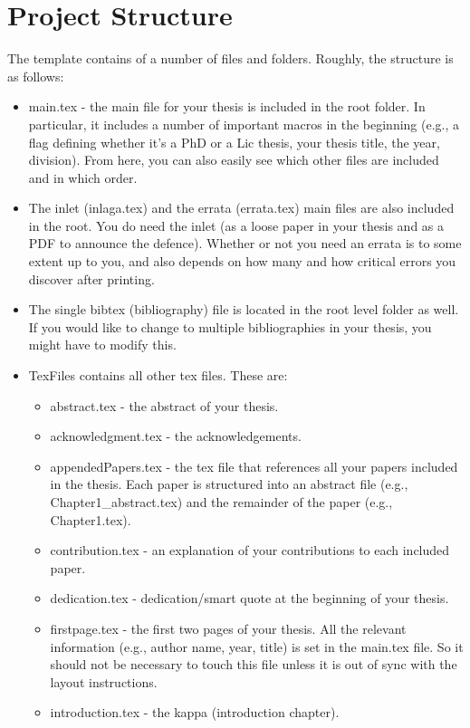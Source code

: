\documentclass[a4paper,10pt]{article}
\begin{document}
\section{Project Structure}
The template contains of a number of files and folders.
Roughly, the structure is as follows:
\begin{itemize}
    \item main.tex - the main file for your thesis is included in the root folder. In particular, it includes a number of important macros in the beginning (e.g., a flag defining whether it's a PhD or a Lic thesis, your thesis title, the year, division). From here, you can also easily see which other files are included and in which order.
    \item The inlet (inlaga.tex) and the errata (errata.tex) main files are also included in the root. You do need the inlet (as a loose paper in your thesis and as a PDF to announce the defence). Whether or not you need an errata is to some extent up to you, and also depends on how many and how critical errors you discover after printing.
    \item The single bibtex (bibliography) file is located in the root level folder as well. If you would like to change to multiple bibliographies in your thesis, you might have to modify this.
    \item TexFiles contains all other tex files. These are:
    \begin{itemize}
        \item abstract.tex - the abstract of your thesis.
        \item acknowledgment.tex - the acknowledgements.
        \item appendedPapers.tex - the tex file that references all your papers included in the thesis. Each paper is structured into an abstract file (e.g., Chapter1\_abstract.tex) and the remainder of the paper (e.g., Chapter1.tex).
        \item contribution.tex - an explanation of your contributions to each included paper.
        \item dedication.tex - dedication/smart quote at the beginning of your thesis.
        \item firstpage.tex - the first two pages of your thesis. All the relevant information (e.g., author name, year, title) is set in the main.tex file. So it should not be necessary to touch this file unless it is out of sync with the layout instructions.
        \item introduction.tex - the kappa (introduction chapter).

\end{itemize}
\end{itemize}
\end{document}

